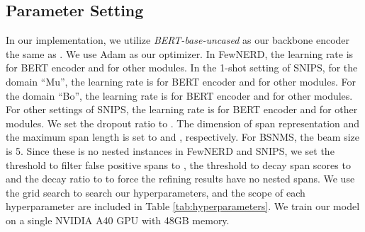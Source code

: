 \documentclass[11pt]{article}
\begin{document}
\subsection{Parameter Setting}
In our implementation, 
we utilize \textit{BERT-base-uncased} as our backbone encoder the same as \cite{fewshothou, span-naacl, FewNERD}. 
We use Adam \cite{adam} as our optimizer.
In FewNERD, the learning rate is  for BERT encoder and  for other modules.
In the 1-shot setting of SNIPS, for the domain ``Mu'', the learning rate is  for BERT encoder and  for other modules.
For the domain ``Bo'', the learning rate is  for BERT encoder and  for other modules.
For other settings of SNIPS, the learning rate is  for BERT encoder and  for other modules.
We set the dropout ratio \cite{dropout} to . 
The dimension of span representation  and the maximum span length  is set to  and , respectively.
For BSNMS, the beam size  is 5.
Since these is no nested instances in FewNERD and SNIPS, we set  the threshold to filter false positive spans  to ,  the threshold to decay span scores  to  and the decay ratio  to  to force the refining results have no nested spans.
We use the grid search to search our hyperparameters, and the scope of each hyperparameter are included in Table \ref{tab:hyperparameters}.
We train our model on a single NVIDIA A40 GPU with 48GB memory. 
\begin{table}[h]
    \centering
    \caption{The searching scope of hyperparameters.}
    \label{tab:hyperparameters}
\end{table}
\end{document}
